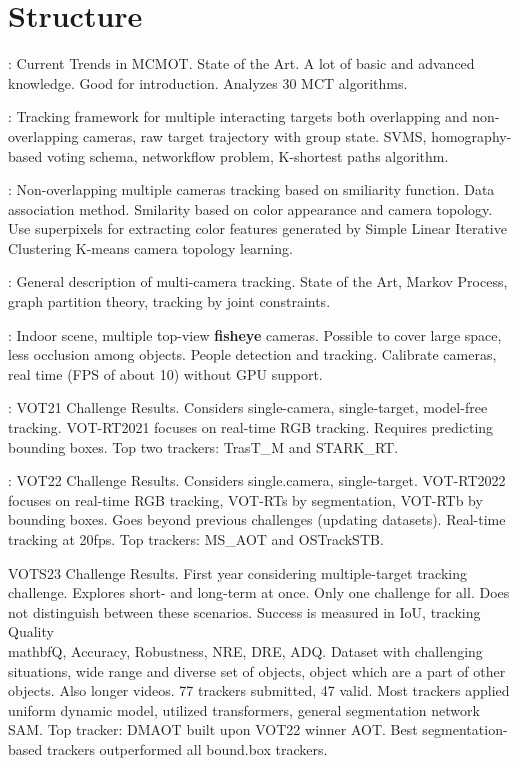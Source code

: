 \chapter{Structure}

\cite{Amosa23}: Current Trends in MCMOT. State of the Art. A lot of basic and advanced knowledge. Good for introduction. Analyzes 30 MCT algorithms.

\cite{Zhang15a}: Tracking framework for multiple interacting targets both overlapping and non-overlapping cameras, raw target trajectory with group state. SVMS, homography-based voting schema, networkflow problem, K-shortest paths algorithm.

\cite{Choi16}: Non-overlapping multiple cameras tracking based on smiliarity function. Data association method. Smilarity based on color appearance and camera topology. Use superpixels for extracting color features generated by Simple Linear Iterative Clustering K-means camera topology learning.

\cite{Tian19}: General description of multi-camera tracking. State of the Art, Markov Process, graph partition theory, tracking by joint constraints.

\cite{Wang21}: Indoor scene, multiple top-view \textbf{fisheye} cameras. Possible to cover large space, less occlusion among objects. People detection and tracking. Calibrate cameras, real time (FPS of about 10) without GPU support.

\cite{Kristan21}: VOT21 Challenge Results. Considers single-camera, single-target, model-free tracking. VOT-RT2021 focuses on real-time RGB tracking. Requires predicting bounding boxes. Top two trackers: TrasT\_M and STARK\_RT.

\cite{Kristan22}: VOT22 Challenge Results. Considers single.camera, single-target. VOT-RT2022 focuses on real-time RGB tracking, VOT-RTs by segmentation, VOT-RTb by bounding boxes. Goes beyond previous challenges (updating datasets). Real-time tracking at 20fps. Top trackers: MS\_AOT and OSTrackSTB.

\cite{Kristan23} VOTS23 Challenge Results. First year considering multiple-target tracking challenge. Explores short- and long-term at once. Only one challenge for all. Does not distinguish between these scenarios. Success is measured in IoU, tracking Quality \\mathbf{Q}, Accuracy, Robustness, NRE, DRE, ADQ. Dataset with challenging situations, wide range and diverse set of objects, object which are a part of other objects.  Also longer videos. 77 trackers submitted, 47 valid. Most trackers applied uniform dynamic model, utilized transformers, general segmentation network SAM. Top tracker: DMAOT built upon VOT22 winner AOT. Best segmentation-based trackers outperformed all bound.box trackers.

